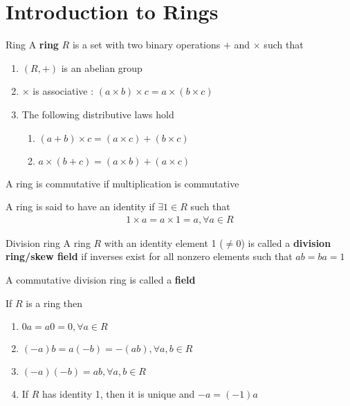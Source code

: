 \documentclass[titlepage, 12pt]{book}
\begin{document}
\chapter{Introduction to Rings}
\begin{definition}{Ring}{}
    A \textbf{ring} $R$ is a set with two binary operations $+$ and $\times$
    such that
    \begin{enumerate}
        \item $(R, +)$ is an abelian group
        \item $\times$ is associative : $(a\times b)\times c = a\times (b\times
            c)$
        \item The following distributive laws hold
            \begin{enumerate}
                \item $(a+b)\times c = (a\times c) + (b\times c)$
                \item $a\times (b+c) = (a\times b) + (a\times c)$
            \end{enumerate}
    \end{enumerate}
\end{definition}

A ring is commutative if multiplication is commutative

A ring is said to have an identity if $\exists 1\in R$ such that
\begin{gather*}
    1\times a = a\times 1 = a, \forall a\in R
\end{gather*}

\begin{definition}{Division ring}{}
    A ring $R$ with an identity element 1 ($\neq 0$) is called a
    \textbf{division ring/skew field} if inverses exist for all nonzero elements
    such that $ab=ba=1$
\end{definition}

A commutative division ring is called a \textbf{field}

\begin{proposition}{}{}
    If $R$ is a ring then
    \begin{enumerate}
        \item $0a=a0=0, \forall a\in R$
        \item $(-a)b=a(-b)=-(ab), \forall a,b\in R$
        \item $(-a)(-b) = ab,\forall a,b\in R$
        \item If $R$ has identity 1, then it is unique and $-a = (-1)a$
    \end{enumerate}
\end{proposition}
\end{document}
